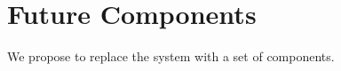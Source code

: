 \documentclass[../main-v1.tex]{subfiles}
\begin{document}












\section{Future Components}
We propose to replace the  system with a set of components. 
\end{document}
